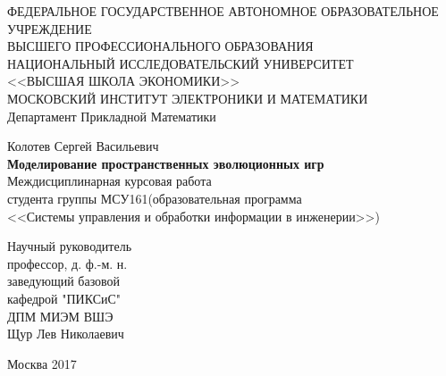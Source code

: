 \documentclass[14pt]{article}
\begin{document}
\begin{titlepage}
	\begin{center}
		ФЕДЕРАЛЬНОЕ ГОСУДАРСТВЕННОЕ АВТОНОМНОЕ ОБРАЗОВАТЕЛЬНОЕ  \\
		УЧРЕЖДЕНИЕ \\
		ВЫСШЕГО ПРОФЕССИОНАЛЬНОГО ОБРАЗОВАНИЯ \\
		НАЦИОНАЛЬНЫЙ ИССЛЕДОВАТЕЛЬСКИЙ УНИВЕРСИТЕТ\\
		<<ВЫСШАЯ ШКОЛА ЭКОНОМИКИ>> \\
		МОСКОВСКИЙ ИНСТИТУТ ЭЛЕКТРОНИКИ И МАТЕМАТИКИ \\
		\vspace{5ex}
		Департамент Прикладной Математики
		\vspace{0.5ex}
		
	\end{center}
	
	\vspace{15ex}
	\begin{center}
		Колотев Сергей Васильевич\\
		\vspace{1ex}
		\textbf{Моделирование пространственных эволюционных игр}\\
		\vspace{5ex}
		Междисциплинарная курсовая работа \\
		студента группы МСУ161(образовательная программа\\
		<<Системы управления и обработки информации в инженерии>>)
		
	\end{center}	
	\vspace{15ex}
	\begin{flushright}
		\noindent
		Научный руководитель
		\\
		профессор, д. ф.-м. н.\\
		заведующий базовой\\
		кафедрой "ПИКСиС"\\
		ДПМ МИЭМ ВШЭ\\
		Щур Лев Николаевич
	\end{flushright}
	
	
	
	\begin{center}	
		\vfill
		Москва 2017
	\end{center}
\end{titlepage}

\tableofcontents

\newpage
\end{document}
